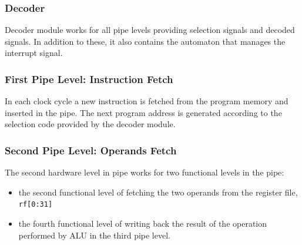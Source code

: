 \subsubsection{Decoder}

Decoder module works for all pipe levels providing selection signals and decoded signals. In addition to these, it also contains the automaton that manages the interrupt signal.


\subsubsection{First Pipe Level: Instruction Fetch}

In each clock cycle a new instruction is fetched from the program memory and inserted in the pipe. The next program address is generated according to the selection code provided by the decoder module.


\subsubsection{Second Pipe Level: Operands Fetch}

The second hardware level in pipe works for two functional levels in the pipe:
\begin{itemize}
    \item the second functional level of fetching the two operands from the register file, {\tt rf[0:31]}
    \item the fourth functional level of writing back the result of the operation performed by ALU in the third pipe level.
\end{itemize}

